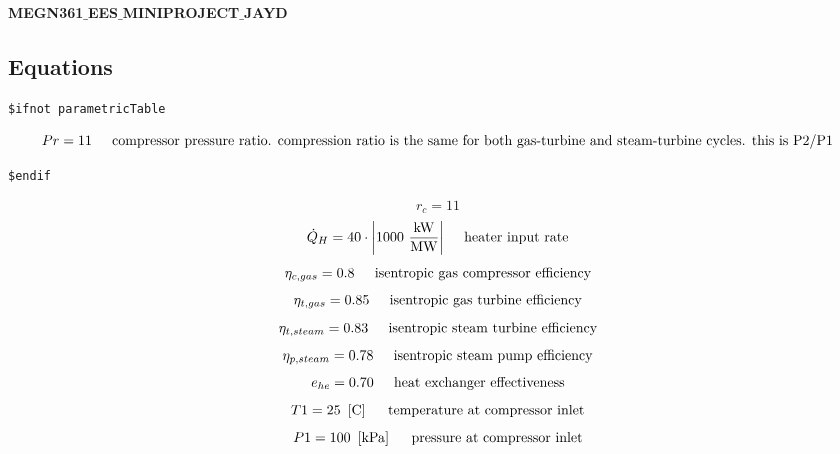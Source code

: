 \documentclass[10pt,fleqn]{article}
\newcommand{\V}[1]{\mbox{$ #1 $}}
\newcommand{\I}{\mbox{\hspace{0.20in}}}
\begin{document}
\begin{center}
\bf \mbox{MEGN361$\_$EES$\_$MINIPROJECT$\_$JAYD}
\vspace{0.2 in}
\end{center}
\subsection*{Equations}
\begin{verbatim}
$ifnot parametricTable
\end{verbatim}  \begin{equation}
\label{EES Eqn:1}
\V{Pr}  = 11 
\mbox{\I compressor pressure ratio. compression ratio is the same for both gas-turbine and steam-turbine cycles. this is P2/P1}
\end{equation}
\begin{verbatim}
$endif
\end{verbatim}  \begin{equation}
\label{EES Eqn:2}
r_{c} = 11 
\end{equation}
\begin{equation}
\label{EES Eqn:3}
\dot {Q}_{H} = 40\cdot \rm { \left|1000\ \frac {\rm{kW}}{\rm{MW}}\right|} 
\mbox{\I heater input rate}
\end{equation}
\begin{equation}
\label{EES Eqn:4}
\eta_{c,gas} = 0.8 
\mbox{\I isentropic gas compressor efficiency}
\end{equation}
\begin{equation}
\label{EES Eqn:5}
\eta_{t,gas} = 0.85 
\mbox{\I isentropic gas turbine efficiency}
\end{equation}
\begin{equation}
\label{EES Eqn:6}
\eta_{t,steam} = 0.83 
\mbox{\I isentropic steam turbine efficiency}
\end{equation}
\begin{equation}
\label{EES Eqn:7}
\eta_{p,steam} = 0.78 
\mbox{\I isentropic steam pump efficiency}
\end{equation}
\begin{equation}
\label{EES Eqn:8}
e_{he} = 0.70 
\mbox{\I heat exchanger effectiveness}
\end{equation}
\begin{equation}
\label{EES Eqn:9}
\V{T1}  = 25   \   \left[ \rm C \right] 
\mbox{\I temperature at compressor inlet}
\end{equation}
\begin{equation}
\label{EES Eqn:10}
\V{P1}  = 100   \   \left[ \rm kPa \right] 
\mbox{\I pressure at compressor inlet}
\end{equation}
\end{document}
